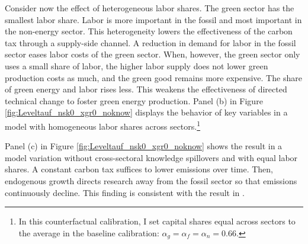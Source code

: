 Consider now the effect of heterogeneous labor shares. The green sector has the smallest labor share. Labor is more important in the fossil and most important in the non-energy sector. This heterogeneity lowers the effectiveness of the carbon tax through a supply-side channel. 
A reduction in demand for labor in the fossil sector eases labor costs of the green sector. When, however, the green sector only uses a small share of labor, the higher labor supply does not lower green production costs as much, and the green good remains more expensive. The share of green energy and labor rises less. This weakens the effectiveness of directed technical change to foster green energy production. 
Panel (b) in Figure \ref{fig:Leveltauf_nsk0_xgr0_noknow} displays the behavior of key variables in a model with homogeneous labor shares across sectors.\footnote{ In this counterfactual calibration, I set capital shares equal across sectors to the average in the baseline calibration: $\alpha_g=\alpha_f=\alpha_n=0.66$. } 





Panel (c) in Figure \ref{fig:Leveltauf_nsk0_xgr0_noknow} shows the result in a model variation without cross-sectoral knowledge spillovers and with equal labor shares. A constant carbon tax suffices to lower emissions over time. Then, endogenous growth directs research away from the fossil sector so that emissions continuously decline.  This finding is consistent with the result in \cite{Acemoglu2012TheChange}. %

